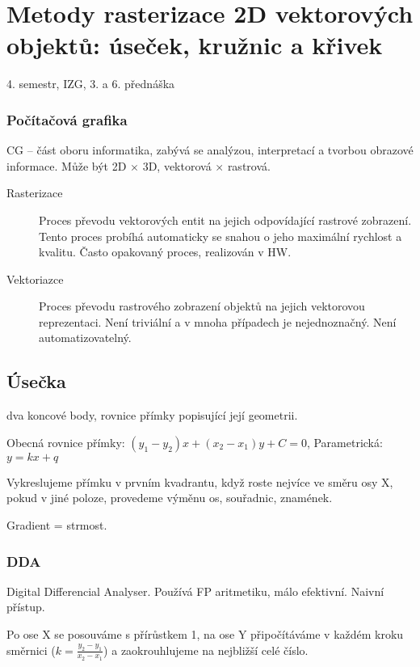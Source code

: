 \documentclass[a4paper, 11pt]{report}
\begin{document}
\chapter{Metody rasterizace 2D vektorových objektů: úseček, kružnic a křivek} \label{cha:11}

4. semestr, IZG, 3. a 6. přednáška


\subsection{Počítačová grafika}

CG -- část oboru informatika, zabývá se analýzou, interpretací a tvorbou obrazové informace. Může být 2D $\times$ 3D, vektorová $\times$ rastrová.

\begin{description}
	\item[Rasterizace] Proces převodu vektorových entit na jejich odpovídající rastrové zobrazení. Tento proces probíhá automaticky se snahou o jeho maximální rychlost a kvalitu. Často opakovaný proces, realizován v HW.
	\item[Vektoriazce] Proces převodu rastrového zobrazení objektů na jejich vektorovou reprezentaci. Není triviální a v mnoha případech je nejednoznačný. Není automatizovatelný.
\end{description}

\section{Úsečka}
dva koncové body, rovnice přímky popisující její geometrii.

Obecná rovnice přímky: $(y_1 - y_2) x + (x_2 - x_1) y + C = 0$, Parametrická: $y = kx + q$

Vykreslujeme přímku v prvním kvadrantu, když roste nejvíce ve směru osy X, pokud v jiné poloze, provedeme výměnu os, souřadnic, znamének.

Gradient = strmost.

\subsection{DDA}

Digital Differencial Analyser. Používá FP aritmetiku, málo efektivní. Naivní přístup.

Po ose X se posouváme s přírůstkem 1, na ose Y připočítáváme v každém kroku směrnici ($k = \frac{y_2-y_1}{x_2-x_1}$) a zaokrouhlujeme na nejbližší celé číslo.
\end{document}
